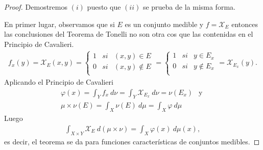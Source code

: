 \begin{proof}
    Demostremos $(i)$ puesto que $(ii)$ se prueba de la misma forma.

    En primer lugar, observamos que si $E$ es un conjunto medible y $f = \mathcal{X}_E$ entonces las conclusiones del Teorema de Tonelli no son otra cos que las contenidas en el Principio de Cavalieri.
    \begin{align*}
        f_x(y) = \mathcal{X}_E(x,y) = \left\{ \begin{array}{lcc}
                                                  1 & si & (x,y) \in E      \\
                                                  0 & si & (x,y) \not \in E \\
                                              \end{array}
        \right. = \left\{ \begin{array}{lcc}
                              1 & si & y \in E_x      \\
                              0 & si & y \not \in E_x \\
                          \end{array}
        \right. = \mathcal{X}_{E_x}(y).
    \end{align*}
    Aplicando el Principio de Cavalieri
    \begin{align*}
        \varphi(x) = \int_{Y}{f_x \ d\nu} = \int_{Y}{\mathcal{X}_{E_x} \ d\nu} = \nu(E_x) \ \ \text{ y } \\
        \mu \times \nu (E) = \int_{X}{\nu(E) \ d\mu} = \int_{X}{\varphi \ d\mu}
    \end{align*}
    Luego
    \begin{align*}
        \int_{X \times Y}{\mathcal{X}_E \ d(\mu \times \nu)} = \int_{X}{ \varphi(x) \ d\mu(x)},
    \end{align*}
    es decir, el teorema se da para funciones características de conjuntos medibles.


\end{proof}
